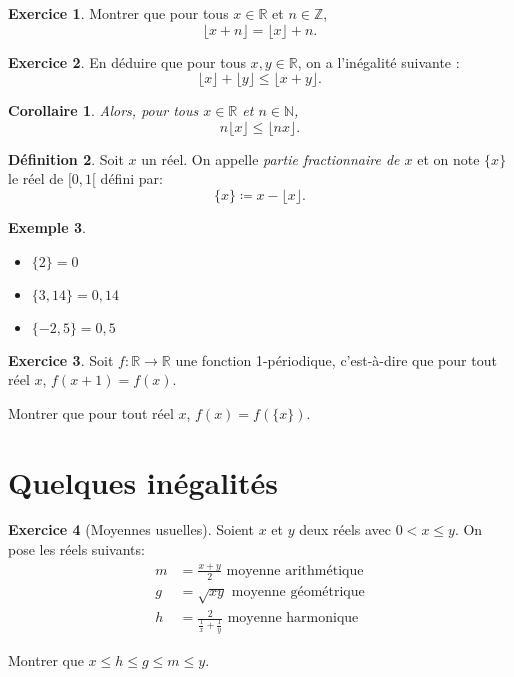 \documentclass{article}
\theoremstyle{definition}
\newtheorem{mydef}{Définition}[section]
\newtheorem{exo}{Exercice}
\newtheorem{exe}[mydef]{Exemple}
\theoremstyle{remark}
\theoremstyle{plain}
\newtheorem{cor}[mydef]{Corollaire}
\newcommand{\N}{\mathbb N}
\newcommand{\Z}{\mathbb Z}
\newcommand{\R}{\mathbb R}
\begin{document}
\begin{exo}
	Montrer que pour tous $x\in\R$ et $n\in\Z$,
	\[ \lfloor x+n\rfloor = \lfloor x\rfloor + n. \]
\end{exo}

\begin{exo}
	En déduire que pour tous $x,y\in\R$, on a l'inégalité suivante :
	\[ \lfloor x\rfloor + \lfloor y\rfloor \leq \lfloor x+y\rfloor. \]
\end{exo}

\begin{cor}
	Alors, pour tous $x\in\R$ et $n\in\N$,
	\[ n\lfloor x\rfloor \leq \lfloor nx\rfloor. \]
\end{cor}

\begin{mydef}
	Soit $x$ un réel. On appelle \textit{partie fractionnaire de $x$} et on note $\{x\}$ le réel de $[0,1[$ défini par:
	\[ \{x\} \coloneqq x - \lfloor x\rfloor. \]
\end{mydef}

\begin{exe}\leavevmode
	\begin{itemize}
		\item $\{2\} = 0$
		\item $\{3,14\} = 0,14$
		\item $\{-2,5\} = 0,5$
	\end{itemize}
\end{exe}

\begin{exo}
	Soit $f:\R\longrightarrow\R$ une fonction 1-périodique, c'est-à-dire que pour tout réel $x$, $f(x+1)=f(x)$.
	
	Montrer que pour tout réel $x$, $f(x)= f(\{x\})$.
\end{exo}

\section{Quelques inégalités}

\begin{exo}[Moyennes usuelles]
	Soient $x$ et $y$ deux réels avec $0<x\leq y$. On pose les réels suivants:
	\begin{align*}
		m &= \frac{x+y}{2}\text{ moyenne arithmétique} \\
		g &= \sqrt{xy}\text{ moyenne géométrique} \\
		h &= \frac{2}{\frac{1}{x}+\frac{1}{y}}\text{ moyenne harmonique}
	\end{align*}
	
	Montrer que $x\leq h\leq g \leq m\leq y$.
\end{exo}
\end{document}
